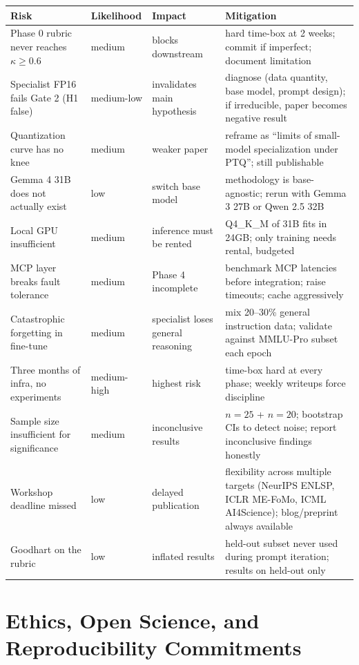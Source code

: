 \documentclass[11pt]{article}
\begin{document}
\begin{longtable}{p{} p{} p{} p{}}
\toprule
\textbf{Risk} & \textbf{Likelihood} & \textbf{Impact} & \textbf{Mitigation} \\
\midrule
\endhead
Phase 0 rubric never reaches $\kappa \geq 0.6$ & medium & blocks downstream & hard time-box at 2 weeks; commit if imperfect; document limitation \\
Specialist FP16 fails Gate 2 (H1 false) & medium-low & invalidates main hypothesis & diagnose (data quantity, base model, prompt design); if irreducible, paper becomes negative result \\
Quantization curve has no knee & medium & weaker paper & reframe as ``limits of small-model specialization under PTQ''; still publishable \\
Gemma 4 31B does not actually exist & low & switch base model & methodology is base-agnostic; rerun with Gemma 3 27B or Qwen 2.5 32B~\cite{yang2024qwen25} \\
Local GPU insufficient & medium & inference must be rented & Q4\_K\_M of 31B fits in 24GB; only training needs rental, budgeted \\
MCP layer breaks fault tolerance & medium & Phase 4 incomplete & benchmark MCP latencies before integration; raise timeouts; cache aggressively \\
Catastrophic forgetting in fine-tune & medium & specialist loses general reasoning & mix 20--30\% general instruction data; validate against MMLU-Pro subset each epoch~\cite{luo2023catastrophic} \\
Three months of infra, no experiments & medium-high & highest risk & time-box hard at every phase; weekly writeups force discipline \\
Sample size insufficient for significance & medium & inconclusive results & $n=25$ + $n=20$; bootstrap CIs to detect noise; report inconclusive findings honestly \\
Workshop deadline missed & low & delayed publication & flexibility across multiple targets (NeurIPS ENLSP, ICLR ME-FoMo, ICML AI4Science); blog/preprint always available \\
Goodhart on the rubric & low & inflated results & held-out subset never used during prompt iteration; results on held-out only \\
\bottomrule
\end{longtable}

\section{Ethics, Open Science, and Reproducibility Commitments}
\end{document}
